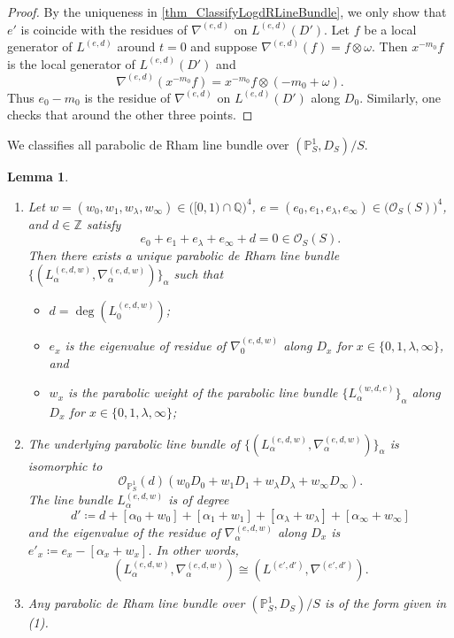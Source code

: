 \documentclass[12pt,twoside]{book}
\theoremstyle{plain}
\newtheorem{lemma}[lemma]{Lemma}
\theoremstyle{definition}
\theoremstyle{remark}
\newcommand{\bP}{{\mathbb P}}
\newcommand{\bQ}{{\mathbb Q}}
\newcommand{\bZ}{{\mathbb Z}}
\newcommand{\mO}{{\mathcal O}}
\numberwithin{equation}{section}
\begin{document}
\begin{proof}
By the uniqueness in \autoref{thm_ClassifyLogdRLineBundle}, we only show that $e'$ is coincide with the residues of $\nabla^{(e,d)}$ on $L^{(e,d)}(D')$. Let $f$ be a local generator of $L^{(e,d)}$ around $t=0$ and suppose $\nabla^{(e,d)}(f)=f\otimes \omega$. Then $x^{-m_0}f$ is the local generator of $L^{(e,d)}(D')$ and
\[\nabla^{(e,d)}(x^{-m_0}f) = x^{-m_0}f \otimes (-m_0 + \omega).\]
Thus $e_0-m_0$ is the residue of $\nabla^{(e,d)}$ on $L^{(e,d)}(D')$ along $D_0$. Similarly, one checks that around the other three points.
\end{proof}

We classifies all parabolic de Rham line bundle over $(\bP^1_S,D_S)/S$.
\begin{lemma} \label{thm_ClassfyParabolicdRLineBundle}
\begin{enumerate}
\item[(1)] Let $w=(w_0,w_1,w_\lambda,w_\infty)\in \Big([0,1)\cap \bQ\Big)^4$, $e=(e_0,e_1,e_\lambda,e_\infty)\in \Big(\mO_S(S)\Big)^4$, and $d\in \bZ$ satisfy
\[e_0+e_1+e_\lambda+e_\infty + d = 0 \in \mO_S(S).\]
Then there exists a unique parabolic de Rham line bundle $\{(L^{(e,d,w)}_\alpha,\nabla^{(e,d,w)}_\alpha)\}_{\alpha}$ such that
\begin{itemize}
\item $d=\deg(L^{(e,d,w)}_0)$;
\item $e_x$ is the eigenvalue of residue of $\nabla^{(e,d,w)}_0$ along $D_x$ for $x\in\{0,1,\lambda,\infty\}$, and
\item $w_x$ is the parabolic weight of the parabolic line bundle $\{L^{(w,d,e)}_\alpha\}_\alpha$ along $D_x$ for $x\in\{0,1,\lambda,\infty\}$;
\end{itemize}
\item[(2)] The underlying parabolic line bundle of $\{(L^{(e,d,w)}_\alpha,\nabla^{(e,d,w)}_\alpha)\}_{\alpha}$ is isomorphic to
\[\mO_{\bP^1_S}(d)(w_0D_0 + w_1D_1 + w_\lambda D_\lambda +w_\infty D_\infty).\]
The line bundle $L^{(e,d,w)}_\alpha$ is of degree
\[d'\coloneqq d+[\alpha_0+w_0]+[\alpha_1+w_1]+[\alpha_\lambda+w_\lambda]+[\alpha_\infty+w_\infty]\]
and the eigenvalue of the residue of $\nabla^{(e,d,w)}_\alpha$ along $D_x$ is $e'_x\coloneqq e_x-[\alpha_x+w_x]$. In other words,
\[(L^{(e,d,w)}_\alpha,\nabla^{(e,d,w)}_\alpha) \cong (L^{(e',d')},\nabla^{(e',d')}).\]
\item[(3)] Any parabolic de Rham line bundle over $(\bP^1_S,D_S)/S$ is of the form given in (1).
\end{enumerate}
\end{lemma}
\end{document}
